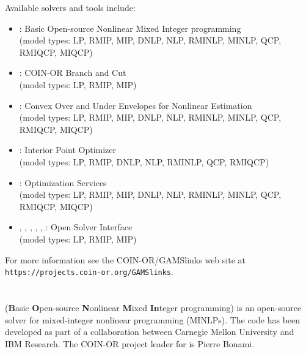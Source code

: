 Available solvers and tools include:
\begin{itemize}
\item \BONMIN: Basic Open-source Nonlinear Mixed Integer programming\\
(model types: LP, RMIP, MIP, DNLP, NLP, RMINLP, MINLP, QCP, RMIQCP, MIQCP)
\item \CBC: COIN-OR Branch and Cut\\
(model types: LP, RMIP, MIP)
\item \COUENNE: Convex Over and Under Envelopes for Nonlinear Estimation\\
(model types: LP, RMIP, MIP, DNLP, NLP, RMINLP, MINLP, QCP, RMIQCP, MIQCP)
\item \IPOPT: Interior Point Optimizer\\
(model types: LP, RMIP, DNLP, NLP, RMINLP, QCP, RMIQCP)
\item \OS: Optimization Services\\
(model types: LP, RMIP, MIP, DNLP, NLP, RMINLP, MINLP, QCP, RMIQCP, MIQCP)
\item \OSICPLEX, \OSIGLPK, \OSIGUROBI, \OSIMOSEK, \OSISOPLEX, \OSIXPRESS: Open Solver Interface\\
(model types: LP, RMIP, MIP)
\end{itemize}

For more information see the COIN-OR/GAMSlinks web site at
\texttt{https://projects.coin-or.org/GAMSlinks}.

\section{\BONMIN}


\BONMIN (\textbf{B}asic \textbf{O}pen-source \textbf{N}onlinear \textbf{M}ixed \textbf{In}teger programming) is an open-source solver for mixed-integer nonlinear programming (MINLPs).
The code has been developed as part of a collaboration between Carnegie Mellon University and IBM Research.
The COIN-OR project leader for \BONMIN is Pierre Bonami.

